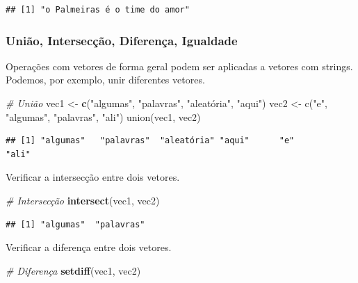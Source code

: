 \documentclass[]{book}
\newenvironment{Shaded}{\begin{snugshade}}{\end{snugshade}}
\newcommand{\CommentTok}[1]{\textcolor[rgb]{0.56,0.35,0.01}{\textit{#1}}}
\newcommand{\KeywordTok}[1]{\textcolor[rgb]{0.13,0.29,0.53}{\textbf{#1}}}
\newcommand{\NormalTok}[1]{#1}
\newcommand{\StringTok}[1]{\textcolor[rgb]{0.31,0.60,0.02}{#1}}
\begin{document}
\begin{verbatim}
## [1] "o Palmeiras é o time do amor"
\end{verbatim}

\hypertarget{uniuxe3o-intersecuxe7uxe3o-diferenuxe7a-igualdade}{%
\subsubsection{União, Intersecção, Diferença, Igualdade}\label{uniuxe3o-intersecuxe7uxe3o-diferenuxe7a-igualdade}}

Operações com vetores de forma geral podem ser aplicadas a vetores com strings. Podemos, por exemplo, unir diferentes vetores.

\begin{Shaded}
\begin{Highlighting}[]
\CommentTok{# União }
\NormalTok{vec1 <-}\StringTok{ }\KeywordTok{c}\NormalTok{(}\StringTok{"algumas"}\NormalTok{, }\StringTok{"palavras"}\NormalTok{, }\StringTok{"aleatória", "}\NormalTok{aqui}\StringTok{")}
\StringTok{vec2 <- c("}\NormalTok{e}\StringTok{", "}\NormalTok{algumas}\StringTok{", "}\NormalTok{palavras}\StringTok{", "}\NormalTok{ali}\StringTok{")}
\StringTok{union(vec1, vec2)}
\end{Highlighting}
\end{Shaded}

\begin{verbatim}
## [1] "algumas"   "palavras"  "aleatória" "aqui"      "e"         "ali"
\end{verbatim}

Verificar a intersecção entre dois vetores.

\begin{Shaded}
\begin{Highlighting}[]
\CommentTok{# Intersecção }
\KeywordTok{intersect}\NormalTok{(vec1, vec2)}
\end{Highlighting}
\end{Shaded}

\begin{verbatim}
## [1] "algumas"  "palavras"
\end{verbatim}

Verificar a diferença entre dois vetores.

\begin{Shaded}
\begin{Highlighting}[]
\CommentTok{# Diferença }
\KeywordTok{setdiff}\NormalTok{(vec1, vec2)}
\end{Highlighting}
\end{Shaded}
\end{document}
